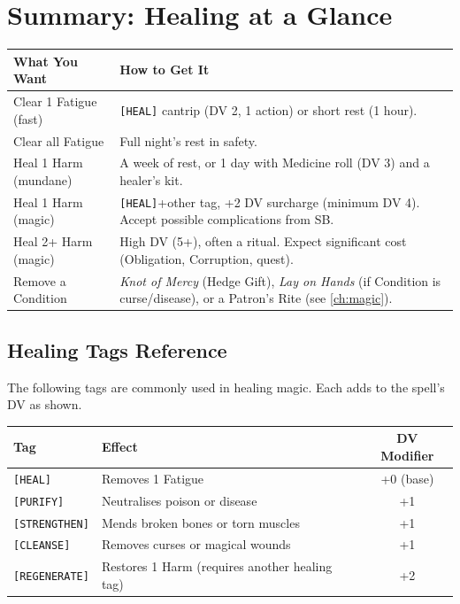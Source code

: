 \section{Summary: Healing at a Glance}
\label{sec:healing-summary}

\begin{table}[h]
\centering
\begin{tabular}{lX}
\toprule
\textbf{What You Want} & \textbf{How to Get It} \\
\midrule
Clear 1 Fatigue (fast) & \texttt{[HEAL]} cantrip (DV 2, 1 action) or short rest (1 hour). \\
Clear all Fatigue & Full night's rest in safety. \\
Heal 1 Harm (mundane) & A week of rest, or 1 day with Medicine roll (DV 3) and a healer's kit. \\
Heal 1 Harm (magic) & \texttt{[HEAL]}+other tag, +2 DV surcharge (minimum DV 4). Accept possible complications from SB. \\
Heal 2+ Harm (magic) & High DV (5+), often a ritual. Expect significant cost (Obligation, Corruption, quest). \\
Remove a Condition & \textit{Knot of Mercy} (Hedge Gift), \textit{Lay on Hands} (if Condition is curse/disease), or a Patron's Rite (see \ref{ch:magic}). \\
\bottomrule
\end{tabular}
\end{table}

\subsection{Healing Tags Reference}
\label{subsec:healing-tags}
The following tags are commonly used in healing magic. Each adds to the spell's DV as shown.

\begin{center}
\begin{tabular}{llc}
\toprule
\textbf{Tag} & \textbf{Effect} & \textbf{DV Modifier} \\
\midrule
\texttt{[HEAL]} & Removes 1 Fatigue & +0 (base) \\
\texttt{[PURIFY]} & Neutralises poison or disease & +1 \\
\texttt{[STRENGTHEN]} & Mends broken bones or torn muscles & +1 \\
\texttt{[CLEANSE]} & Removes curses or magical wounds & +1 \\
\texttt{[REGENERATE]} & Restores 1 Harm (requires another healing tag) & +2 \\
\bottomrule
\end{tabular}
\end{center}

